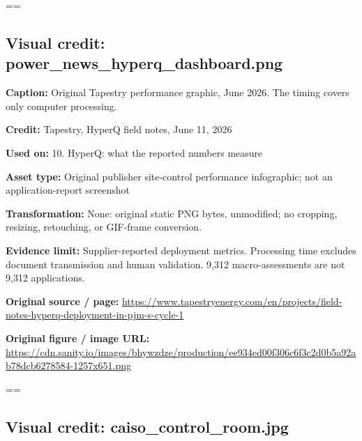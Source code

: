 \documentclass[10pt,letterpaper]{article}
\begin{document}
\egroup\par\noindent\box\readingEntry\par\medskip
\setbox\readingEntry=\vbox\bgroup\hsize=\linewidth\subsection*{Visual credit: power\_news\_hyperq\_dashboard.png}
\textbf{Caption:} Original Tapestry performance graphic, June 2026. The timing covers only computer processing.\par
\textbf{Credit:} Tapestry, HyperQ field notes, June 11, 2026\par
\textbf{Used on:} 10. HyperQ: what the reported numbers measure\par
\textbf{Asset type:} Original publisher site-control performance infographic; not an application-report screenshot\par
\textbf{Transformation:} None: original static PNG bytes, unmodified; no cropping, resizing, retouching, or GIF-frame conversion.\par
\textbf{Evidence limit:} Supplier-reported deployment metrics. Processing time excludes document transmission and human validation. 9,312 macro-assessments are not 9,312 applications.\par
\textbf{Original source / page:} \href{https://www.tapestryenergy.com/en/projects/field-notes-hyperq-deployment-in-pjm-s-cycle-1}{\small\ttfamily https:/\allowbreak{}/\allowbreak{}www.\allowbreak{}tapestryenergy.\allowbreak{}com/\allowbreak{}en/\allowbreak{}projects/\allowbreak{}field-\allowbreak{}notes-\allowbreak{}hyperq-\allowbreak{}deployment-\allowbreak{}in-\allowbreak{}pjm-\allowbreak{}s-\allowbreak{}cycle-\allowbreak{}1}\par
\textbf{Original figure / image URL:} \href{https://cdn.sanity.io/images/bhywzdze/production/ee934ed00f306c6f3c2d0b5a92ab78dcb6278584-1257x651.png}{\small\ttfamily https:/\allowbreak{}/\allowbreak{}cdn.\allowbreak{}sanity.\allowbreak{}io/\allowbreak{}images/\allowbreak{}bhywzdze/\allowbreak{}production/\allowbreak{}ee934ed00f306c6f3c2d0b5a92ab78dcb6278584-\allowbreak{}1257x651.\allowbreak{}png}\par
\egroup\par\noindent\box\readingEntry\par\medskip
\setbox\readingEntry=\vbox\bgroup\hsize=\linewidth\subsection*{Visual credit: caiso\_control\_room.jpg}
\end{document}
